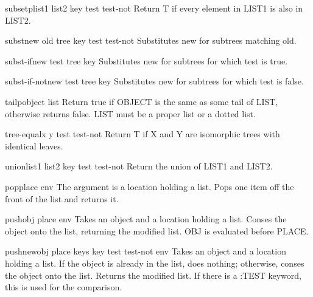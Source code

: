 \begin{function}{subsetp}{list1 list2 \key key test test-not}{}{}
  Return T if every element in LIST1 is also in LIST2.
\end{function}

\begin{function}{subst}{new old tree \key key test test-not}{}{}
  Substitutes new for subtrees matching old.
\end{function}

\begin{function}{subst-if}{new test tree \key key}{}{}
  Substitutes new for subtrees for which test is true.
\end{function}

\begin{function}{subst-if-not}{new test tree \key key}{}{}
  Substitutes new for subtrees for which test is false.
\end{function}

\begin{function}{tailp}{object list}{}{}
  Return true if OBJECT is the same as some tail of LIST, otherwise
   returns false. LIST must be a proper list or a dotted list.
\end{function}

\begin{function}{tree-equal}{x y \key test test-not}{}{}
  Return T if X and Y are isomorphic trees with identical leaves.
\end{function}

\begin{function}{union}{list1 list2 \key key test test-not}{}{}
  Return the union of LIST1 and LIST2.
\end{function}

\begin{macro}{pop}{place \env env}{}{}
  The argument is a location holding a list. Pops one item off the front
  of the list and returns it.
\end{macro}

\begin{macro}{push}{obj place \env env}{}{}
  Takes an object and a location holding a list. Conses the object onto
  the list, returning the modified list. OBJ is evaluated before PLACE.
\end{macro}

\begin{macro}{pushnew}{obj place \rest keys \key key test test-not \env env}{}{}
  Takes an object and a location holding a list. If the object is
  already in the list, does nothing; otherwise, conses the object onto
  the list. Returns the modified list. If there is a :TEST keyword, this
  is used for the comparison.
\end{macro}

